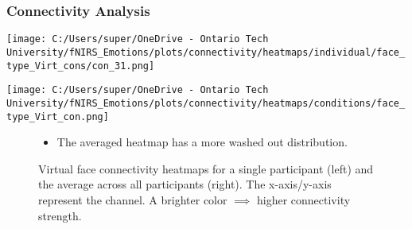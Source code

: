 \documentclass{beamer}
\begin{document}
\begin{frame}
    \frametitle{Connectivity Analysis}
    \begin{minipage}[t]{0.49\textwidth}
        \vspace{-\baselineskip}
        \texttt{[image: C:/Users/super/OneDrive - Ontario Tech University/fNIRS\_Emotions/plots/connectivity/heatmaps/individual/face\_type\_Virt\_cons/con\_31.png]}
        \end{minipage}
        \begin{minipage}[t]{0.49\textwidth}
        \vspace{-\baselineskip}
        \texttt{[image: C:/Users/super/OneDrive - Ontario Tech University/fNIRS\_Emotions/plots/connectivity/heatmaps/conditions/face\_type\_Virt\_con.png]}
    \end{minipage}
    \begin{figure}
        \caption{Virtual face connectivity heatmaps for a single participant (left) and the average across all participants (right).
        The x-axis/y-axis represent the channel. A brighter color \(\implies\) higher connectivity strength.}
        \begin{itemize}
            \item The averaged heatmap has a more washed out distribution.
        \end{itemize}
    \end{figure}
\end{frame}
\end{document}
